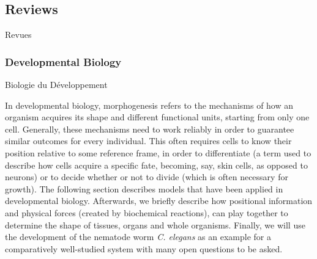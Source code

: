 




\subsection{Reviews}{Revues}

\subsubsection*{Developmental Biology}{Biologie du Développement}


In developmental biology, morphogenesis refers to the mechanisms of how an organism acquires its shape and different functional units, starting from only one cell. Generally, these mechanisms need to work reliably in order to guarantee similar outcomes for every individual. This often requires cells to know their position relative to some reference frame, in order to differentiate (a term used to describe how cells acquire a specific fate, becoming, say, skin cells, as opposed to neurons) or to decide whether or not to divide (which is often necessary for growth). The following section describes models that have been applied in developmental biology.
Afterwards, we briefly describe how positional information and physical forces (created by biochemical reactions), can play together to determine the shape of tissues, organs and whole organisms. Finally, we will use the development of the nematode worm \textit{C. elegans} as an example for a comparatively well-studied system with many open questions to be asked.


